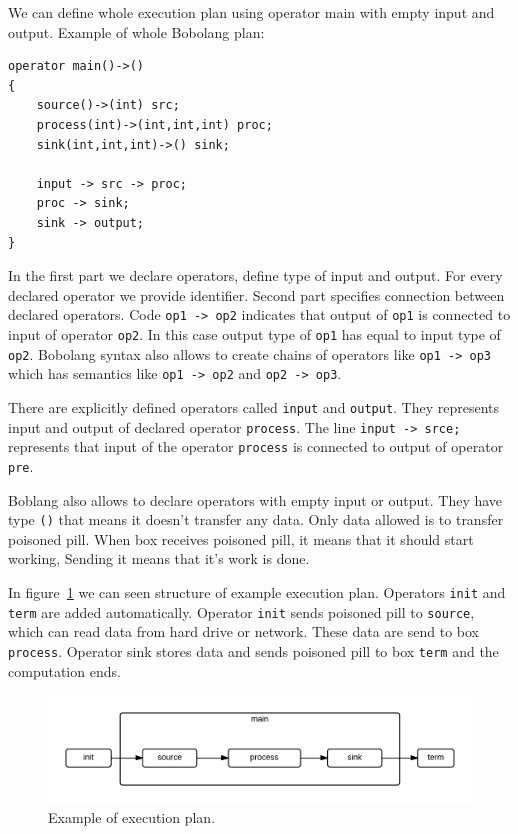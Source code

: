 We can define whole execution plan using operator main with empty input and output. Example of whole Bobolang plan:

\begin{verbatim}
operator main()->()
{
    source()->(int) src;
    process(int)->(int,int,int) proc;
    sink(int,int,int)->() sink;

    input -> src -> proc; 
    proc -> sink;
    sink -> output;
}
\end{verbatim}

In the first part we declare operators, define type of input and output. For every declared operator we provide identifier. Second part specifies connection between declared operators. Code \verb|op1 -> op2| indicates that output of \verb|op1| is connected to input of operator \verb|op2|. In this case output type of \verb|op1| has equal to input type of \verb|op2|. Bobolang syntax also allows to create chains of operators like \verb|op1 -> op3| which has semantics like \verb|op1 -> op2| and \verb|op2 -> op3|. 

There are explicitly defined operators called \verb|input| and \verb|output|. They represents input and output of declared operator \verb|process|. The line \verb|input -> srce;| represents that input of the operator \verb|process| is connected to output of operator \verb|pre|.

Boblang also allows to declare operators with empty input or output. They have type \verb|()| that means it doesn't transfer any data. Only data allowed is to transfer poisoned pill. When box receives poisoned pill, it means that it should start working, Sending it means that it's work is done.


 In figure~\ref{fig:exampleplan} we can seen structure of example execution plan. Operators \verb|init| and \verb|term| are added automatically. Operator \verb|init| sends poisoned pill to \verb|source|, which can read data from hard drive or network. These data are send to box \verb|process|. Operator sink stores data and sends poisoned pill to box \verb|term| and the computation ends.
\begin{figure}[h!]
  \centering

    \includegraphics[width=1\textwidth]{exampleplan}
    
      \caption{Example of execution plan.}
        \label{fig:exampleplan}
\end{figure}




